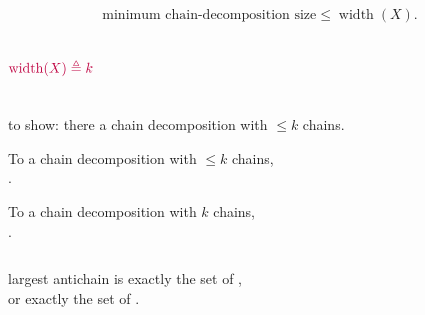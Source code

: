 \begin{frame}{}
  \begin{lemma}
    \[
      \text{minimum chain-decomposition size} \le \operatorname{width}(X).
    \]
  \end{lemma}

  \begin{columns}
      \[
        \textcolor{purple}{\operatorname{width}(X) \triangleq k}
      \]
  \end{columns}

  \pause
  \begin{center}
     to show:
    there  a chain decomposition with $\le k$ chains.

    \pause
    \vspace{1em}
    To  a chain decomposition with $\le k$ chains, \\[3pt]
    .

  \end{center}
\end{frame}

\begin{frame}{}
  \begin{center}
    To  a chain decomposition with $k$ chains, \\[3pt]
    .
  \end{center}

  \begin{columns}
  \end{columns}

  \pause
  \begin{center}
     largest antichain is exactly
    the set of , \\[3pt]
    or exactly the set of .
  \end{center}
\end{frame}

